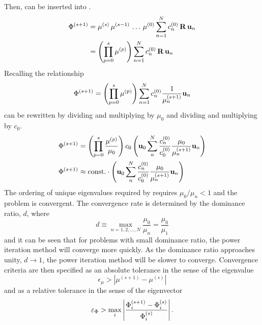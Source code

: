     Then,  can be inserted into
    .
    \begin{align}
      \Phi^{(s+1)} &= \mu^{(s)} \, \mu^{(s-1)} \, \ldots \, 
        \mu^{(0)} \sum_{n=1}^N c_n^{(0)} \, \mathbf{R} \, \mathbf{u}_n \\
      &= \left( \prod_{p=0}^{s} \mu^{(p)} \right) \sum_{n=1}^N c_n^{(0)} \, 
        \mathbf{R} \, \mathbf{u}_n
    \end{align}
    Recalling the relationship 
    \begin{equation}
      \label{eq:phi_expand_above}
      \Phi^{(s+1)} = \left( \prod_{p=0}^s \mu^{(p)} \right) 
        \sum_{n=1}^N c_n^{(0)} \frac{1}{\mu_n^{(s+1)}} \mathbf{u}_n
    \end{equation}
     can be rewritten by dividing and multiplying by
    $\mu_0$ and dividing and multiplying by $c_0$.
    \begin{align}
      \Phi^{(s+1)} &= \left( \prod_{p=0}^s \frac{\mu^{(p)}}{\mu_0} 
        \right) c_0 \left( \mathbf{u}_0 \sum_n^N \frac{c_n^{(0)}}{c_0^{(0)}}
        \frac{\mu_0}{\mu_n^{(s+1)}} \mathbf{u}_n \right) \\
      \label{eq:eigen_phi_converge}
      \Phi^{(s+1)} &\approx \text{const.} \cdot \left( 
        \mathbf{u}_0 \sum_n^N \frac{c_n^{(0)}}{c_0^{(0)}}
        \frac{\mu_0}{\mu_n^{(s+1)}} \mathbf{u}_n \right)
    \end{align}
    The ordering of unique eigenvalues required by  
    requires $\mu_0 / \mu_n < 1$ and the problem is convergent. The 
    convergence rate is determined by the dominance ratio, $d$, where
    \begin{equation}
      \label{eq:dominance_ratio}
      d \equiv \max_{n=1,2,\ldots,N} \frac{\mu_0}{\mu_n} =
        \frac{\mu_0}{\mu_1}
    \end{equation}
    and it can be seen that for problems with small dominance ratio, the power
    iteration method will converge more quickly. As the dominance ratio
    approaches unity, $d \rightarrow 1$, the power iteration method will be
    slower to converge. Convergence criteria are then specified as an absolute 
    tolerance in the sense of the eigenvalue
    \begin{equation}
      \label{eq:eigenvalue_tol}
      \epsilon_{\mu} > | \mu^{(s+1)} - \mu^{(s)} |
    \end{equation}
    and as a relative tolerance in the sense of the eigenvector
    \begin{equation}
      \label{eq:eigenvector_tol}
      \varepsilon_{\Phi} > \max_i \left| \frac{\Phi_i^{(s+1)} - \Phi_i^{(s)}}
        {\Phi_i^{(s)}}\right| .
    \end{equation}

